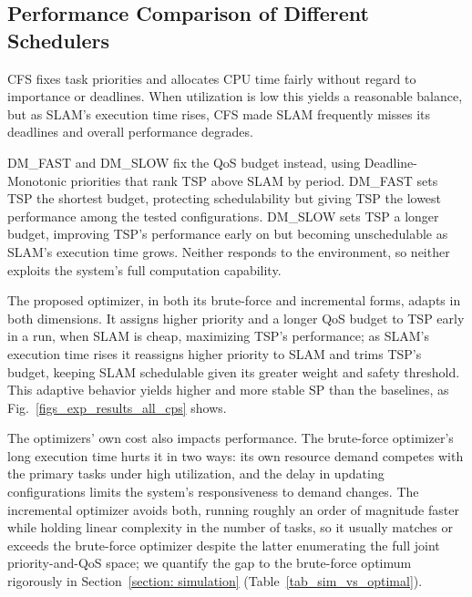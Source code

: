 	\subsection{Performance Comparison of Different Schedulers}
    CFS fixes task priorities and allocates CPU time fairly without regard to
    importance or deadlines.
    When utilization is low this yields a reasonable balance, but as SLAM's
    execution time rises, CFS made SLAM
    frequently misses its deadlines and overall performance degrades.

    DM\_FAST and DM\_SLOW fix the QoS budget instead, using Deadline-Monotonic
    priorities that rank TSP above SLAM by period.
    DM\_FAST sets TSP the shortest budget, protecting schedulability but giving
    TSP the lowest performance among the tested configurations.
    DM\_SLOW sets TSP a longer budget, improving TSP's performance early on but
    becoming unschedulable as SLAM's execution time grows.
    Neither responds to the environment, so neither exploits the system's full
    computation capability.

    The proposed optimizer, in both its brute-force and incremental forms,
    adapts in both dimensions.
    It assigns higher priority and a longer QoS budget to TSP early in a run,
    when SLAM is cheap, maximizing TSP's performance; as SLAM's execution time
    rises it reassigns higher priority to SLAM and trims TSP's budget, keeping
    SLAM schedulable given its greater weight and safety threshold.
    This adaptive behavior yields higher and more stable SP than the baselines,
    as Fig.~\ref{figs_exp_results_all_cps} shows.


    The optimizers' own cost also impacts performance.
    The brute-force optimizer's long execution time hurts it in two ways: its
    own resource demand competes with the primary tasks under high utilization,
    and the delay in updating configurations limits the system's responsiveness
    to demand changes.
    The incremental optimizer avoids both, running roughly an order of magnitude
    faster while holding linear complexity in the number of tasks, so it usually
    matches or exceeds the brute-force optimizer despite the latter enumerating
    the full joint priority-and-QoS space; we quantify the gap to the
    brute-force optimum rigorously in Section~\ref{section: simulation}
    (Table~\ref{tab_sim_vs_optimal}).


